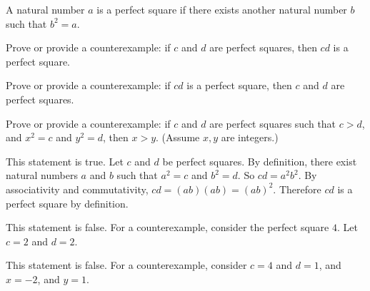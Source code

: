 \documentclass[solution, letterpaper]{cs20}
\begin{document}
A natural number $a$ is a perfect square if there exists another natural number $b$ such that $b^2 = a$.

\subproblem Prove or provide a counterexample: if $c$ and $d$ are perfect squares, then $cd$ is a perfect square.

\subproblem Prove or provide a counterexample: if $cd$ is a perfect square, then $c$ and $d$ are perfect squares.

\subproblem Prove or provide a counterexample: if $c$ and $d$ are perfect squares such that $c > d$, and $x^2 = c$ and $y^2 = d$, then $x > y$. (Assume $x, y$ are integers.)

\begin{solution}

\subsolution This statement is true. Let $c$ and $d$ be perfect squares. By definition, there exist natural numbers $a$ and $b$ such that $a^2 = c$ and $b^2 = d$. So $cd = a^2b^2$. By associativity and commutativity, $cd = (ab)(ab) = (ab)^2$. Therefore $cd$ is a perfect square by definition.

\subsolution This statement is false. For a counterexample, consider the perfect square $4$. Let $c = 2$ and $d = 2$. 

\subsolution This statement is false. For a counterexample, consider $c = 4$ and $d = 1$, and $x = -2$, and $y = 1$.

\end{solution}
\end{document}
